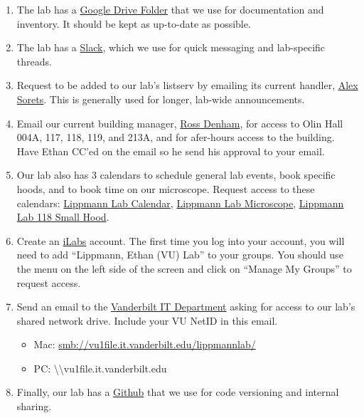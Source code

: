 \documentclass[
]{book}
\begin{document}
\begin{enumerate}
\def\labelenumi{\arabic{enumi}.}
\item
  The lab has a \href{https://drive.google.com/drive/folders/0Bwvn9S-4oeMmeHhzUS1nM0FNak0?usp=sharing}{Google Drive Folder} that we use for documentation and inventory. It should be kept as up-to-date as possible.
\item
  The lab has a \href{https://lippmann-lab.slack.com/join/signup\#/}{Slack}, which we use for quick messaging and lab-specific threads.
\item
  Request to be added to our lab's listserv by emailing its current handler, \href{mailto:alexander.g.sorets@vanderbilt.edu}{Alex Sorets}. This is generally used for longer, lab-wide announcements.
\item
  Email our current building manager, \href{mailto:ross.denham@vanderbilt.edu}{Ross Denham}, for access to Olin Hall 004A, 117, 118, 119, and 213A, and for afer-hours access to the building. Have Ethan CC'ed on the email so he send his approval to your email.
\item
  Our lab also has 3 calendars to schedule general lab events, book specific hoods, and to book time on our microscope. Request access to these calendars: \href{https://calendar.google.com/calendar/u/0?cid=bXFkOWE3bjM3MTkxbzluYWVtbWw0NDd2bGtAZ3JvdXAuY2FsZW5kYXIuZ29vZ2xlLmNvbQ}{Lippmann Lab Calendar}, \href{https://calendar.google.com/calendar/u/0?cid=ZjNkMXBkbmFwZzc0NWR2YmVmNXU0bGN1YjBAZ3JvdXAuY2FsZW5kYXIuZ29vZ2xlLmNvbQ}{Lippmann Lab Microscope}, \href{https://calendar.google.com/calendar/u/0?cid=MGk3NGZpdm5ua2JyZjMyc2duNTE2aGMxOWdAZ3JvdXAuY2FsZW5kYXIuZ29vZ2xlLmNvbQ}{Lippmann Lab 118 Small Hood}.
\item
  Create an \href{https://vanderbilt.corefacilities.org/landing/2191}{iLabs} account. The first time you log into your account, you will need to add ``Lippmann, Ethan (VU) Lab'' to your groups. You should use the menu on the left side of the screen and click on ``Manage My Groups'' to request access.
\item
  Send an email to the \href{mailto:dts.se.support@Vanderbilt.Edu}{Vanderbilt IT Department} asking for access to our lab's shared network drive. Include your VU NetID in this email.

  \begin{itemize}
  \item
    Mac: \url{smb://vu1file.it.vanderbilt.edu/lippmannlab/}
  \item
    PC: \textbackslash\textbackslash vu1file.it.vanderbilt.edu\lippmannlab\\
  \end{itemize}
\item
  Finally, our lab has a \href{https://github.com/LippmannLab}{Github} that we use for code versioning and internal sharing.
\end{enumerate}
\end{document}
